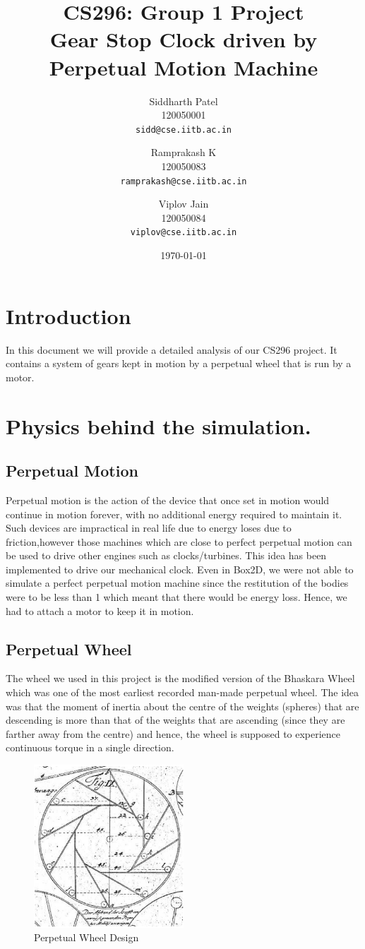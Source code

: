 \documentclass[10pt]{article} \usepackage[a4paper,left=0.8in,right=0.8in,top=0.4in,bottom=0.8in]{geometry} \usepackage{graphicx}
\title{\textbf{CS296: Group 1 Project}\\{Gear Stop Clock driven by Perpetual Motion Machine}}
\author{ Siddharth Patel\\ 
120050001\\ 
\texttt{sidd@cse.iitb.ac.in} 
\and Ramprakash K\\ 
120050083\\ 
\texttt{ramprakash@cse.iitb.ac.in} 
\and Viplov Jain\\ 
120050084\\ 
\texttt{viplov@cse.iitb.ac.in}\\ 
}
\date{\today}
\begin{document}
\maketitle 

\section{Introduction}In this document we will provide a detailed analysis of our CS296 project\cite{main}. It contains a system of gears\cite{wikigr} kept in motion by a perpetual wheel that is run by a motor.
\section{Physics behind the simulation.}
\subsection{Perpetual Motion}
Perpetual motion\cite{wikiper} is the action of the device that once set in motion would continue in motion forever, with no additional energy required to maintain it. Such devices are impractical in real life due to energy loses due to friction,however those machines which are close to perfect perpetual motion can be used to drive other engines such as clocks/turbines. This idea has been implemented to drive our mechanical clock. Even in Box2D, we were not able to simulate a perfect perpetual motion machine since the restitution of the bodies were to be less than 1 which meant that there would be energy loss. Hence, we had to attach a motor to keep it in motion.
\subsection{Perpetual Wheel}
The wheel we used in this project is the modified version of the Bhaskara Wheel which was one of the most earliest recorded man-made perpetual wheel. The idea was that the moment of inertia about the centre of the weights (spheres) that are descending is more than that of the weights that are ascending (since they are farther away from the centre) and hence, the wheel is supposed to experience continuous torque in a single direction.

\begin{figure}[ht!]
\centering
\includegraphics[width=0.5\textwidth]{images/pic.png}
\caption{Perpetual Wheel Design}
\end{figure}
\end{document}

